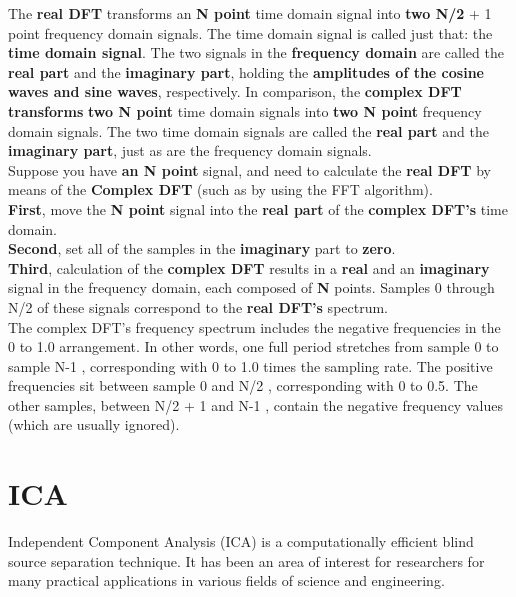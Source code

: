\begin{compactitem}
The \textbf{real DFT} transforms an \textbf{N point} time domain signal into
\textbf{two N/2} + 1 point frequency domain signals. The time domain
signal is called just that: the \textbf{time domain signal}. The two signals in the
\textbf{frequency domain} are called the \textbf{real part} and the \textbf{imaginary part},
holding the \textbf{amplitudes of the cosine waves and sine waves}, respectively.
In comparison, the \textbf{complex DFT transforms} \textbf{two N point} time domain signals
into \textbf{two N point} frequency domain signals. The two time domain signals are
called the \textbf{real part} and the \textbf{imaginary part}, just as are the frequency domain
signals.
\\Suppose you have \textbf{an N point} signal, and need to calculate the \textbf{real DFT} by
means of the \textbf{Complex DFT} (such as by using the FFT algorithm).\\
\textbf{First}, move the \textbf{N point} signal into the \textbf{real part} of the \textbf{complex DFT's} time domain.\\
\textbf{Second}, set all of the samples in the \textbf{imaginary} part to \textbf{zero}.\\
\textbf{Third}, calculation of the \textbf{complex DFT} results in a \textbf{real} and an \textbf{imaginary}
signal in the frequency domain, each composed of \textbf{N} points.
Samples 0 through N/2 of these signals correspond to the \textbf{real DFT's} spectrum.\\
The complex DFT's frequency spectrum includes the negative frequencies in the 0
to 1.0 arrangement. In other words, one full period stretches from sample 0 to
sample N-1 , corresponding with 0 to 1.0 times the sampling rate. The positive
frequencies sit between sample 0 and N/2 , corresponding with 0 to 0.5. The
other samples, between N/2 + 1 and N-1 , contain the negative frequency
values (which are usually ignored). \cite{smith1997dspbook}


\end{compactitem}


\section{ICA}
Independent Component Analysis (ICA) is a computationally efficient blind source separation technique.
It has been an area of interest for researchers for many practical applications in various fields of science and
engineering.

